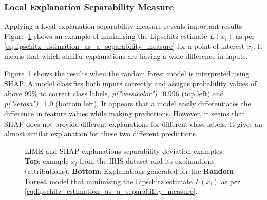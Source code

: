 \documentclass[english]{tktltiki2}
\theoremstyle{definition}
\theoremstyle{remark}
\begin{document}


\subsubsection*{Local Explanation Separability Measure}
Applying a local explanation separability measure reveals important results. Figure~\ref{fig:iris_rf_deviation_separability} shows an example of minimising the Lipschitz estimate $L(x_i)$ as per \eqref{eq:lipschitz_estimation_as_a_separability_measure} for a point of interest $x_i$. It means that which similar explanations are having a wide difference in inputs.

Figure~\ref{fig:iris_rf_deviation_separability} shows the results when the random forest model is interpreted using SHAP. A model classifies both inputs correctly and assigns probability values of above 99\% to correct class labels, \textit{p("versicolor")}=0.996 (top left) and \textit{p("setosa")}=1.0 (bottom left). It appears that a model easily differentiates the difference in feature values while making predictions. However, it seems that SHAP does not provide different explanations for different class labels. It gives an almost similar explanation for these two different predictions. 

\begin{figure}[H]
	\hspace*{\fill}%
	\caption{LIME and SHAP explanations separability deviation examples: \textbf{Top}: example $x_i$ from the IRIS dataset and its explanations (attributions). \textbf{Bottom}: Explanations generated for the \textbf{Random Forest} model that minimising the Lipschitz estimate $L(x_i)$ as per \eqref{eq:lipschitz_estimation_as_a_separability_measure}.}%
	\label{fig:iris_rf_deviation_separability}%
\end{figure}
\end{document}
